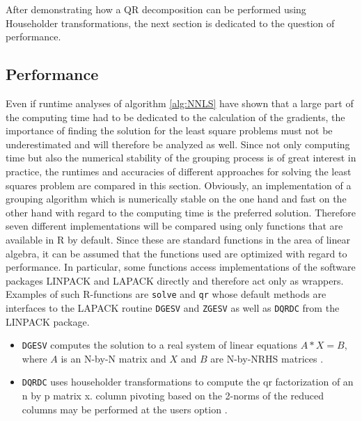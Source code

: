 After demonstrating how a QR decomposition can be performed using Householder transformations, the next section is dedicated to the question of performance. 

\subsection{Performance}

Even if runtime analyses of algorithm \ref{alg:NNLS} have shown that a large part of the computing time had to be dedicated to the calculation of the gradients, the importance of finding the solution for the least square problems must not be underestimated and will therefore be analyzed as well. Since not only computing time but also the numerical stability of the grouping process is of great interest in practice, the runtimes and accuracies of different approaches for solving the least squares problem are compared in this section.  Obviously, an implementation of a grouping algorithm which is numerically stable on the one hand and fast on the other hand with regard to the computing time is the preferred solution. Therefore seven different implementations will be compared using only functions that are available in \textsf{R} by default. Since these are standard functions in the area of linear algebra, it can be assumed that the functions used are optimized with regard to performance. In particular, some functions access implementations of the software packages LINPACK and LAPACK directly and therefore act only as wrappers. Examples of such \textsf{R}-functions are \texttt{solve} and \texttt{qr} whose default methods are interfaces to the LAPACK routine \texttt{DGESV} and \texttt{ZGESV} as well as \texttt{DQRDC} from the LINPACK package. 

\begin{itemize}
	\item \texttt{DGESV} computes the solution to a real system of linear equations $A * X = B$, where $A$ is an N-by-N matrix and $X$ and $B$ are N-by-NRHS matrices \cite{lapack}.
	\item \texttt{DQRDC} uses householder transformations to compute the qr factorization of an n by p matrix x.  column pivoting based on the 2-norms of the reduced columns may be performed at the users option \cite{linpack}.
\end{itemize}

